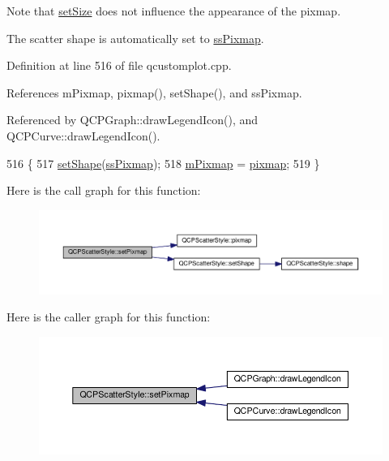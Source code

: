 Note that \hyperlink{class_q_c_p_scatter_style_aaefdd031052892c4136129db68596e0f}{set\+Size} does not influence the appearance of the pixmap.

The scatter shape is automatically set to \hyperlink{class_q_c_p_scatter_style_adb31525af6b680e6f1b7472e43859349a8718b849ca7c307b07b8e091efb0c31e}{ss\+Pixmap}. 

Definition at line 516 of file qcustomplot.\+cpp.



References m\+Pixmap, pixmap(), set\+Shape(), and ss\+Pixmap.



Referenced by Q\+C\+P\+Graph\+::draw\+Legend\+Icon(), and Q\+C\+P\+Curve\+::draw\+Legend\+Icon().


\begin{DoxyCode}
516                                                      \{
517   \hyperlink{class_q_c_p_scatter_style_a7c641c4d4c6d29cb705d3887cfce91c1}{setShape}(\hyperlink{class_q_c_p_scatter_style_adb31525af6b680e6f1b7472e43859349a8718b849ca7c307b07b8e091efb0c31e}{ssPixmap});
518   \hyperlink{class_q_c_p_scatter_style_a7697346c89b19d4cd1d8dd33319ec9e3}{mPixmap} = \hyperlink{class_q_c_p_scatter_style_a9bab44cc41fcd585621a4b3e0e48231b}{pixmap};
519 \}
\end{DoxyCode}


Here is the call graph for this function\+:\nopagebreak
\begin{figure}[H]
\begin{center}
\leavevmode
\includegraphics[width=350pt]{class_q_c_p_scatter_style_a5fb611d46acfac520d7b89a1c71d9246_cgraph}
\end{center}
\end{figure}




Here is the caller graph for this function\+:\nopagebreak
\begin{figure}[H]
\begin{center}
\leavevmode
\includegraphics[width=350pt]{class_q_c_p_scatter_style_a5fb611d46acfac520d7b89a1c71d9246_icgraph}
\end{center}
\end{figure}


